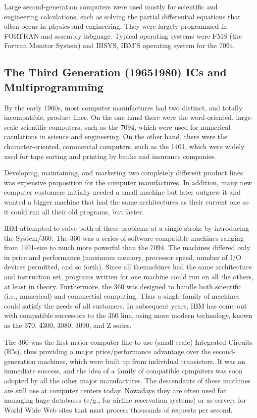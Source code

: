 \documentclass{book}
\begin{document}
Large second-generation computers were used mostly for scientific and engineering calculations, 
such as solving the partial differential equations that often occur in physics and engineering.
They were largely programmed in FORTRAN and assembly labguage.
Typical operating systems were FMS (the Fortran Monitor System) and IBSYS, IBM'S operating system for the 7094.

\subsection{The Third Generation (19651980) ICs and Multiprogramming}
By the early 1960s, most computer manufactures had two distinct, and totally incompatible, product lines.
On the one hand there were the word-oriented, large-scale scientific computers, such as the 7094, 
which were used for numerical caculations in science and engineering.
On the other hand, there were the character-oriented, commercial computers, such as the 1401, 
which were widely used for tape sorting and printing by banks and insurance companies.

Developing, maintaining, and marketing two completely different product lines was expensive proposition for the computer manufactures.
In addition, many new computer customers initially needed a small machine but later outgrew it and wanted a bigger machine 
that had the same architectures as their current one so it could run all their old programs, but faster.

IBM attempted to solve both of these problems at a single stroke by introducing the System/360.
The 360 was a series of software-compatible machines ranging from 1401-size to much more powerful than the 7094.
The machines differed only in price and performance (maximum memory, processor speed, number of I/O devices permitted, and so forth).
Since all themachines had the same architecture and instruction set, programs written for one machine could run on all the others, at least in theory.
Furthermore, the 360 was designed to handle both scientific (i.e., numerical) and commertial computing.
Thus a single family of machines could satisfy the needs of all customers.
In subsequent years, IBM has come out with compatible successors to the 360 line, using more modern technology, 
known as the 370, 4300, 3080, 3090, and Z series.

The 360 was the first major computer line to use (small-scale) Integrated Circuits (ICs), 
thus providing a major price/performance advantage over the second-generation machines, which were built up from individual transistors.
It was an immediate success, and the idea of a family of compatible cpmputers was soon adopted by all the other major manufactures.
The descendants of these machines are still use at computer centers today.
Nowadays they are often used for managing huge databases (e/g., for airline reservation systems) 
or as servers for World Wide Web sites that must process thousands of requests per second.










\end{document}
